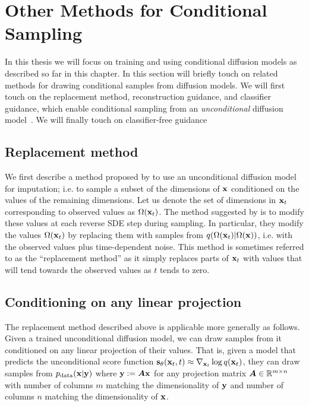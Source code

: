 \section{Other Methods for Conditional Sampling} \label{sec:other-methods-for-conditional-sampling}
In this thesis we will focus on training and using conditional diffusion models as described so far in this chapter. In this section will briefly touch on related methods for drawing conditional samples from diffusion models. We will first touch on the replacement method, reconstruction guidance, and classifier guidance, which enable conditional sampling from an \textit{unconditional} diffusion model~\citep{song2020score,kadkhodaie2020solving,mittal2021symbolic,ho2022video}. We will finally touch on classifier-free guidance

\subsection{Replacement method}
We first describe a method proposed by \citet{song2020score} to use an unconditional diffusion model for imputation; i.e. to sample a subset of the dimensions of ${\mathbf{x}}$ conditioned on the values of the remaining dimensions.
Let us denote the set of dimensions in ${\mathbf{x}}_t$ corresponding to observed values as $\Omega({\mathbf{x}}_t)$. The method suggested by \citet{song2020score} is to modify these values at each reverse SDE step during sampling. In particular, they modify the values $\Omega({\mathbf{x}}_t)$ by replacing them with samples from $q(\Omega({\mathbf{x}}_t) | \Omega({\mathbf{x}}))$, i.e. with the observed values plus time-dependent noise. This method is sometimes referred to as the ``replacement method'' as it simply replaces parts of ${\mathbf{x}}_t$ with values that will tend towards the observed values as $t$ tends to zero.

\subsection{Conditioning on any linear projection}
The replacement method described above is applicable more generally as follows. Given a trained unconditional diffusion model, we can draw samples from it conditioned on any linear projection of their values. That is, given a model that predicts the unconditional score function ${\mathbf{s}}_\theta({\mathbf{x}}_t, t) \approx \nabla_{{\mathbf{x}}_t} \log q({\mathbf{x}}_t)$, they can draw samples from $p_{\rm{data}}({\mathbf{x}}|{\mathbf{y}})$ where ${\mathbf{y}}:={\bm{A}}{\mathbf{x}}$ for any projection matrix ${\bm{A}} \in \mathbb{R}^{m \times n}$ with number of columns $m$ matching the dimensionality of ${\mathbf{y}}$ and number of columns $n$ matching the dimensionality of ${\mathbf{x}}$.

